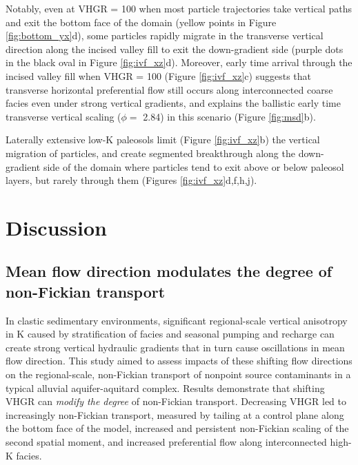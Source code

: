 Notably, even at VHGR = 100 when most particle trajectories take vertical paths and exit the bottom face of the domain (yellow points in Figure \ref{fig:bottom_yx}d), some particles rapidly migrate in the transverse vertical direction along the incised valley fill to exit the down-gradient side (purple dots in the black oval in Figure \ref{fig:ivf_xz}d). Moreover, early time arrival through the incised valley fill when VHGR = 100 (Figure \ref{fig:ivf_xz}c) suggests that transverse horizontal preferential flow still occurs along interconnected coarse facies even under strong vertical gradients, and explains the ballistic early time transverse vertical scaling ($\phi = $ 2.84) in this scenario (Figure \ref{fig:msd}b).

Laterally extensive low-K paleosols limit (Figure \ref{fig:ivf_xz}b) the vertical migration of particles, and create segmented breakthrough along the down-gradient side of the domain where particles tend to exit above or below paleosol layers, but rarely through them (Figures \ref{fig:ivf_xz}d,f,h,j).





\section{Discussion}

%
%
\subsection{Mean flow direction modulates the degree of non-Fickian transport}
\label{ss_4_1}

In clastic sedimentary environments, significant regional-scale vertical anisotropy in K caused by stratification of facies and seasonal pumping and recharge can create strong vertical hydraulic gradients that in turn cause oscillations in mean flow direction. This study aimed to assess impacts of these shifting flow directions on the regional-scale, non-Fickian transport of nonpoint source contaminants in a typical alluvial aquifer-aquitard complex. Results demonstrate that shifting VHGR can \textit{modify the degree} of non-Fickian transport. Decreasing VHGR led to increasingly non-Fickian transport, measured by tailing at a control plane along the bottom face of the model, increased and persistent non-Fickian scaling of the second spatial moment, and increased preferential flow along interconnected high-K facies. 

